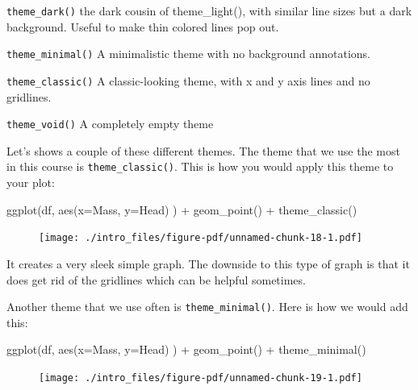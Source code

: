 \documentclass[
  letterpaper,
  DIV=11,
  numbers=noendperiod]{scrreprt}
\newenvironment{Shaded}{\begin{snugshade}}{\end{snugshade}}
\newcommand{\AttributeTok}[1]{\textcolor[rgb]{0.40,0.45,0.13}{#1}}
\newcommand{\FunctionTok}[1]{\textcolor[rgb]{0.28,0.35,0.67}{#1}}
\newcommand{\NormalTok}[1]{\textcolor[rgb]{0.00,0.23,0.31}{#1}}
\newcommand{\SpecialCharTok}[1]{\textcolor[rgb]{0.37,0.37,0.37}{#1}}
\begin{document}
\texttt{theme\_dark()} the dark cousin of theme\_light(), with similar
line sizes but a dark background. Useful to make thin colored lines pop
out.

\texttt{theme\_minimal()} A minimalistic theme with no background
annotations.

\texttt{theme\_classic()} A classic-looking theme, with x and y axis
lines and no gridlines.

\texttt{theme\_void()} A completely empty theme

Let's shows a couple of these different themes. The theme that we use
the most in this course is \texttt{theme\_classic()}. This is how you
would apply this theme to your plot:

\begin{Shaded}
\begin{Highlighting}[]
\FunctionTok{ggplot}\NormalTok{(df, }\FunctionTok{aes}\NormalTok{(}\AttributeTok{x=}\NormalTok{Mass, }\AttributeTok{y=}\NormalTok{Head) ) }\SpecialCharTok{+} 
  \FunctionTok{geom\_point}\NormalTok{() }\SpecialCharTok{+}
  \FunctionTok{theme\_classic}\NormalTok{()}
\end{Highlighting}
\end{Shaded}

\begin{figure}[H]

{\centering \texttt{[image: ./intro\_files/figure-pdf/unnamed-chunk-18-1.pdf]}

}

\end{figure}

It creates a very sleek simple graph. The downside to this type of graph
is that it does get rid of the gridlines which can be helpful sometimes.

Another theme that we use often is \texttt{theme\_minimal()}. Here is
how we would add this:

\begin{Shaded}
\begin{Highlighting}[]
\FunctionTok{ggplot}\NormalTok{(df, }\FunctionTok{aes}\NormalTok{(}\AttributeTok{x=}\NormalTok{Mass, }\AttributeTok{y=}\NormalTok{Head) ) }\SpecialCharTok{+} 
  \FunctionTok{geom\_point}\NormalTok{() }\SpecialCharTok{+}
  \FunctionTok{theme\_minimal}\NormalTok{()}
\end{Highlighting}
\end{Shaded}

\begin{figure}[H]

{\centering \texttt{[image: ./intro\_files/figure-pdf/unnamed-chunk-19-1.pdf]}

}

\end{figure}
\end{document}
